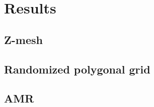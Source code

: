 \section{Results} \label{sec_results}
\subsection{Z-mesh}
\subsection{Randomized polygonal grid}
\subsection{AMR}
